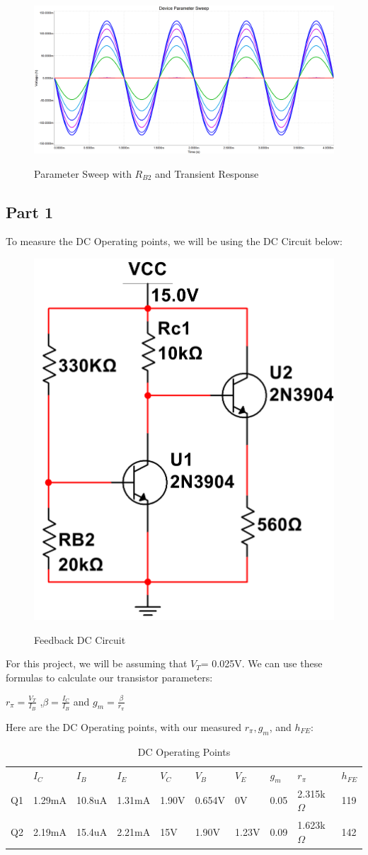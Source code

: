 \documentclass[12pt]{article}
\begin{document}
\begin{figure}[h!]
    \centering
    \includegraphics[height=0.45\textwidth]{Images/parametersweep.png}\\
    \caption{Parameter Sweep with $R_{B2}$ and Transient Response}
    \label{fig:parametersweep}
\end{figure}
\FloatBarrier

\subsection{Part 1}
To measure the DC Operating points, we will be using the DC Circuit below:
\begin{figure}[h!]
    \centering
    \includegraphics[height=0.3\textwidth]{Images/partCDC.png}\\
    \caption{Feedback DC Circuit}
    \label{fig:feedbacdccircuit}
\end{figure}
\FloatBarrier
For this project, we will be assuming that $V_T$= 0.025V. We can use these formulas to 
calculate our transistor parameters:
\begin{center}
    $r_\pi= \frac{V_T}{I_B}$ ,$\beta = \frac{I_C}{I_B}$ and $g_m = \frac{\beta}{r_\pi}$
\end{center}
Here are the DC Operating points, with our measured $r_\pi,g_m$, and $h_{FE}$:
\FloatBarrier
\begin{table}[h!]
    \centering
    \begin{tabular}{l|lllllllll}
     & $I_C$ & $I_B$ & $I_E$ & $V_C$ & $V_B$ & $V_E$ & $g_m$ & $r_\pi$ & $h_{FE}$ \\ \cline{1-10}
    Q1 & 1.29mA & 10.8uA & 1.31mA & 1.90V & 0.654V & 0V & 0.05 & 2.315k$\Omega$ & 119  \\ \cline{1-10}
    Q2 & 2.19mA & 15.4uA & 2.21mA & 15V & 1.90V & 1.23V & 0.09 & 1.623k$\Omega$ & 142
    \end{tabular}%
    \caption{DC Operating Points}
    \label{DC Operating Points}
\end{table}
\end{document}
